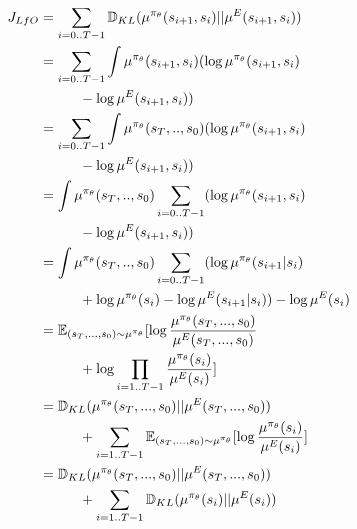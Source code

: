 \documentclass{article}
\begin{document}
\begin{equation}
\begin{aligned}
    J_{LfO} & =  \sum_{i = 0..T-1} \mathbb{D}_{KL}(\mu^{\pi_{\theta}}(s_{i+1},s_i)||\mu^E(s_{i+1},s_i))\\
    & = \sum_{i = 0..T-1} \int \mu^{\pi_{\theta}}(s_{i+1},s_i)(\log \mu^{\pi_{\theta}}(s_{i+1},s_i) \\& \hspace{1.0cm} - \log \mu^E(s_{i+1},s_i)) \\
    & =\sum_{i = 0..T-1} \int \mu^{\pi_{\theta}}(s_T,..,s_0)(\log \mu^{\pi_{\theta}}(s_{i+1},s_i) \\&\hspace{1.0cm} - \log \mu^E(s_{i+1},s_i)) \\
    & = \int \mu^{\pi_{\theta}}(s_T,..,s_0) \sum_{i = 0..T-1} (\log \mu^{\pi_{\theta}}(s_{i+1},s_i) \\&\hspace{1.0cm} - \log \mu^E(s_{i+1},s_i)) \\
    & = \int \mu^{\pi_{\theta}}(s_T,..,s_0) \sum_{i = 0..T-1} (\log \mu^{\pi_{\theta}}(s_{i+1}|s_i) \\&\hspace{1.0cm} + \log \mu^{\pi_{\theta}}(s_i) - \log \mu^E(s_{i+1}|s_i)) - \log \mu^E(s_i) \\
    & = \mathbb{E}_{(s_T,...,s_0) \sim \mu^{\pi_{\theta}}}[ \log  \frac{\mu^{\pi_{\theta}}(s_T,...,s_0)}{\mu^E(s_T,...,s_0)} \\&\hspace{1.0cm} + \log \prod_{i = 1..T-1} \frac{\mu^{\pi_{\theta}}(s_i)}{\mu^E(s_i)} ] \\
    & = \mathbb{D}_{KL}(\mu^{\pi_{\theta}}(s_T,...,s_0)||\mu^E(s_T,...,s_0)) \\&\hspace{1.0cm} + \sum_{i = 1..T-1}\mathbb{E}_{(s_T,...,s_0) \sim \mu^{\pi_{\theta}}}[\log \frac{\mu^{\pi_{\theta}}(s_i)}{\mu^E(s_i)} ] \\
    & =  \mathbb{D}_{KL}(\mu^{\pi_{\theta}}(s_T,...,s_0)||\mu^E(s_T,...,s_0)) \\&\hspace{1.0cm} + \sum_{i = 1..T-1} \mathbb{D}_{KL}(\mu^{\pi_{\theta}}(s_i)||\mu^E(s_i))
\end{aligned}
\end{equation}
\end{document}
